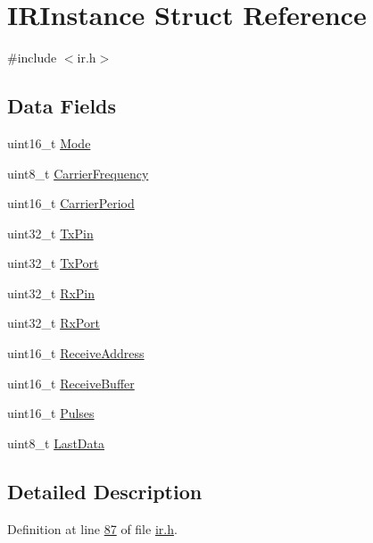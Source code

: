 \hypertarget{struct_i_r_instance}{\section{I\-R\-Instance Struct Reference}
\label{struct_i_r_instance}
}


{\ttfamily \#include $<$ir.\-h$>$}

\subsection*{Data Fields}
\begin{DoxyCompactItemize}
\item 
uint16\-\_\-t \hyperlink{struct_i_r_instance_a08ae347b1b1741d54a0e1472bebe0c41}{Mode}
\item 
uint8\-\_\-t \hyperlink{struct_i_r_instance_a23a3063e6f24eaca78f9e0db2f3bd07f}{Carrier\-Frequency}
\item 
uint16\-\_\-t \hyperlink{struct_i_r_instance_a7ce4e156e8b335f4ab8da1ab95e8bb78}{Carrier\-Period}
\item 
uint32\-\_\-t \hyperlink{struct_i_r_instance_ad8db5c2b6d458ef94408fc171aa7fabc}{Tx\-Pin}
\item 
uint32\-\_\-t \hyperlink{struct_i_r_instance_a0491d3193cddc5b568be222f147dcfcc}{Tx\-Port}
\item 
uint32\-\_\-t \hyperlink{struct_i_r_instance_ab9fd2a831b0252be9553645df9250c54}{Rx\-Pin}
\item 
uint32\-\_\-t \hyperlink{struct_i_r_instance_a5202eb791e1291a983144f72a457d38d}{Rx\-Port}
\item 
uint16\-\_\-t \hyperlink{struct_i_r_instance_a76f9d50da2a9a8c4e4ee3f61e2296514}{Receive\-Address}
\item 
uint16\-\_\-t \hyperlink{struct_i_r_instance_aba9722c0b3b4643583f06d05d23bc54d}{Receive\-Buffer}
\item 
uint16\-\_\-t \hyperlink{struct_i_r_instance_a374091556baaf95cb29a195e877efc1c}{Pulses}
\item 
uint8\-\_\-t \hyperlink{struct_i_r_instance_a5d62b35c44888dcb86452195478269fe}{Last\-Data}
\end{DoxyCompactItemize}


\subsection{Detailed Description}


Definition at line \hyperlink{ir_8h_source_l00087}{87} of file \hyperlink{ir_8h_source}{ir.\-h}.



